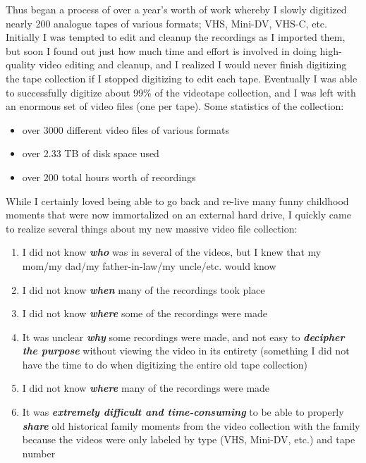 Thus began a process of over a year's worth of work whereby I slowly digitized nearly 200 analogue tapes of various formats; VHS, Mini-DV, VHS-C, etc.  Initially I was tempted to edit and cleanup the recordings as I imported them, but soon I found out just how much time and effort is involved in doing high-quality video editing and cleanup, and I realized I would never finish digitizing the tape collection if I stopped digitizing to edit each tape.  Eventually I was able to successfully digitize about 99\% of the videotape collection, and I was left with an enormous set of video files (one per tape).  Some statistics of the collection:

\begin{itemize}[noitemsep]
\item over 3000 different video files of various formats
\item over 2.33 TB of disk space used
\item over 200 total hours worth of recordings
\end{itemize}

While I certainly loved being able to go back and re-live many funny childhood moments that were now immortalized on an external hard drive, I quickly came to realize several things about my new massive video file collection:

\begin{enumerate}[noitemsep]
\item I did not know \textbf{\textit{who}} was in several of the videos, but I knew that my mom/my dad/my father-in-law/my uncle/etc. would know
\item I did not know \textbf{\textit{when}} many of the recordings took place
\item I did not know \textbf{\textit{where}} some of the recordings were made
\item It was unclear \textbf{\textit{why}} some recordings were made, and not easy to \textbf{\textit{decipher the purpose}} without viewing the video in its entirety (something I did not have the time to do when digitizing the entire old tape collection)
\item I did not know \textbf{\textit{where}} many of the recordings were made
\item It was \textbf{\textit{extremely difficult and time-consuming}} to be able to properly \textbf{\textit{share}} old historical family moments from the video collection with the family because the videos were only labeled by type (VHS, Mini-DV, etc.) and tape number
\end{enumerate}

